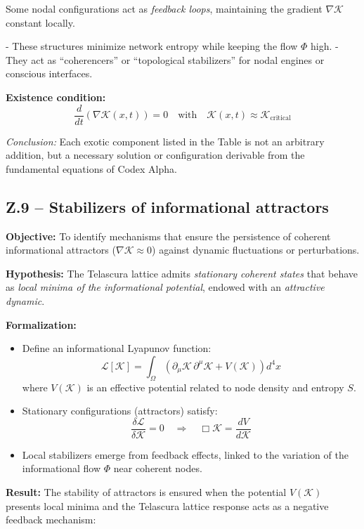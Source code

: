 \documentclass[12pt]{article}
\begin{document}
Some nodal configurations act as \emph{feedback loops}, maintaining the gradient $\nabla \mathcal{K}$ constant locally.

- These structures minimize network entropy while keeping the flow $\Phi$ high.
- They act as “coherencers” or “topological stabilizers” for nodal engines or conscious interfaces.

\textbf{Existence condition:}
\[
\frac{d}{dt} \left( \nabla \mathcal{K}(x,t) \right) = 0 \quad \text{with} \quad \mathcal{K}(x,t) \approx \mathcal{K}_{\text{critical}}
\]

\textit{Conclusion:} Each exotic component listed in the Table is not an arbitrary addition, but a necessary solution or configuration derivable from the fundamental equations of Codex Alpha.

\subsection*{Z.9 – Stabilizers of informational attractors}

\textbf{Objective:} To identify mechanisms that ensure the persistence of coherent informational attractors ($\nabla \mathcal{K} \approx 0$) against dynamic fluctuations or perturbations.

\textbf{Hypothesis:} The Telascura lattice admits \emph{stationary coherent states} that behave as \emph{local minima of the informational potential}, endowed with an \emph{attractive dynamic}.

\textbf{Formalization:}
\begin{itemize}
    \item Define an informational Lyapunov function:
    \[
        \mathcal{L}[\mathcal{K}] = \int_{\Omega} \left( \partial_\mu \mathcal{K} \, \partial^\mu \mathcal{K} + V(\mathcal{K}) \right) d^4x
    \]
    where $V(\mathcal{K})$ is an effective potential related to node density and entropy $S$.
    
    \item Stationary configurations (attractors) satisfy:
    \[
        \frac{\delta \mathcal{L}}{\delta \mathcal{K}} = 0 \quad \Rightarrow \quad \Box \mathcal{K} = \frac{dV}{d\mathcal{K}}
    \]
    
    \item Local stabilizers emerge from feedback effects, linked to the variation of the informational flow $\Phi$ near coherent nodes.
\end{itemize}

\textbf{Result:}  
The stability of attractors is ensured when the potential $V(\mathcal{K})$ presents local minima and the Telascura lattice response acts as a negative feedback mechanism:
\end{document}
